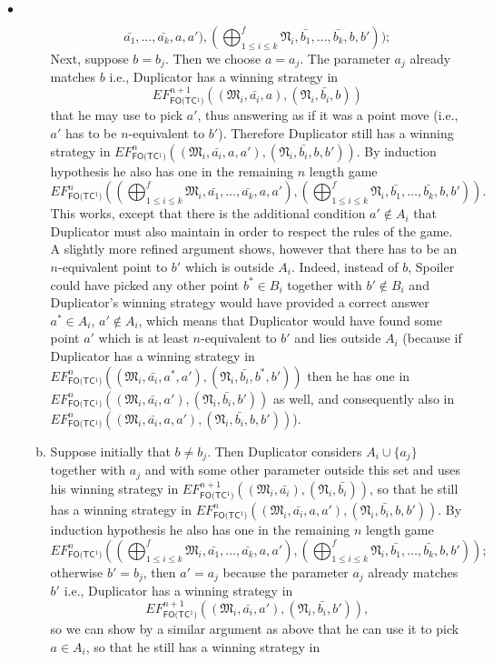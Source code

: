 \documentclass{LMCS}
\newcommand{\frM}{\mathfrak{M}}
\newcommand{\frN}{\mathfrak{N}}
\newcommand{\fotc}{\textsf{FO(TC$^1$)}\xspace}
\begin{document}
\begin{iteMize}{$\bullet$}
\begin{enumerate}[1.]
\begin{enumerate}[a)]
$$\bar{a_1},\ldots,\bar{a_k},a,a'), (\bigoplus_{ 1 \leq i
\leq k}^f \frN_i, \bar{b_1},\ldots,\bar{b_k},b,b'));$$ 
Next, suppose
$b=b_j$. Then we choose $a=a_j$. The parameter $a_j$ already matches
$b$ i.e., Duplicator has a winning strategy in
$$EF_\fotc^{n+1}((\frM_i,\bar{a_i},a),(\frN_i,\bar{b_i},b))$$ that he may
use to pick
$a'$, thus answering as if it was a point move (i.e., $a'$ has to be
$n$-equivalent to $b'$).  Therefore Duplicator still has a winning strategy
in $EF_\fotc^n((\frM_i,\bar{a_i},a,a'),(\frN_i,\bar{b_i},b,b'))$.
By induction hypothesis he also has one in the remaining $n$
length game $$EF_\fotc^n((\bigoplus_{1\leq i\leq k}^f \frM_i,
\bar{a_1},\ldots,\bar{a_k},a,a'), (\bigoplus_{1\leq i \leq
k}^f \frN_i, \bar{b_1},\ldots,\bar{b_k},b,b')).$$ This works, except that there is the additional condition
$a'\notin A_i$ that Duplicator must
also maintain in order to respect the rules of the game. A slightly more refined argument shows, however
that there
has to be an $n$-equivalent point to $b'$ which is outside $A_i$.
Indeed, instead of $b$, Spoiler could have picked any other point
$b^*\in B_i$ together with $b' \notin B_i$ and Duplicator's
winning strategy would have provided a correct answer $a^*\in
A_i$, $a'\notin A_i$, which means that Duplicator would have found
some point $a'$ which is at least $n$-equivalent to $b'$ and lies
outside $A_i$ (because if Duplicator has a winning strategy in
$EF_\fotc^n((\frM_i,\bar{a_i},a^*,a'),(\frN_i,\bar{b_i},b^*,b'))$
then he has one in
$EF_\fotc^n((\frM_i,\bar{a_i},a'),(\frN_i,\bar{b_i},b'))$ as well,
and consequently also in
$EF_\fotc^n((\frM_i,\bar{a_i},a,a'),(\frN_i,\bar{b_i},b,b'))$).
\item  Suppose initially that $b \neq b_j$.  Then Duplicator
considers $A_i \cup \{a_j\}$ together with $a_j$ and with some
other parameter outside this set and uses his winning strategy in
$EF_\fotc^{n+1}((\frM_i,\bar{a_i}),(\frN_i,\bar{b_i}))$, so that he
still has a winning strategy in
$EF_\fotc^n((\frM_i,\bar{a_i},a,a'),(\frN_i,\bar{b_i},b,b'))$. By
induction hypothesis he also has one in the remaining $n$ length
game $$EF_\fotc^n((\bigoplus_{1\leq i\leq k}^f \frM_i,
\bar{a_1},\ldots,\bar{a_k},a,a'), (\bigoplus_{1\leq i \leq
k}^f \frN_i, \bar{b_1},\ldots,\bar{b_k},b,b'));$$ otherwise
$b'=b_j$, then $a'=a_j$ because the parameter $a_j$ already
matches $b'$ i.e., Duplicator has a winning strategy in
$$EF_\fotc^{n+1}((\frM_i,\bar{a_i},a'),(\frN_i,\bar{b_i},b')),$$ so we
can show by a similar argument as above
that he can use it to pick $a\in A_i$, so that he still has a winning strategy in

\end{enumerate}
\end{enumerate}
\end{iteMize}
\end{document}
